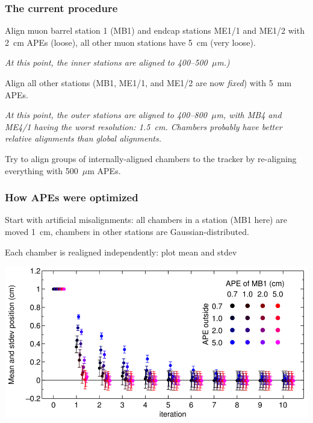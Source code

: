\documentclass[compress]{beamer}
\begin{document}
\begin{frame}
\frametitle{The current procedure}

\begin{enumerate}\setlength{\itemsep}{0.25 cm}
\item Align muon barrel station 1 (MB1) and endcap stations ME1/1 and
ME1/2 with 2~cm APEs (loose), all other muon stations have 5~cm (very
loose).

\vspace{0.25 cm}
{\it At this point, the inner stations are aligned to 400--500~$\mu$m.)

\item Align all other stations (MB1, ME1/1, and ME1/2 are now {\it
fixed}) with 5~mm APEs.}

\vspace{0.25 cm} {\it At this point, the outer stations are aligned to
400--800~$\mu$m, with MB4 and ME4/1 having the worst resolution:
1.5~cm.  Chambers probably have better relative alignments
than global alignments.}

\item Try to align groups of internally-aligned chambers to the
tracker by re-aligning everything with 500~$\mu$m APEs.

\end{enumerate}
\end{frame}

\begin{frame}
\frametitle{How APEs were optimized}

Start with artificial misalignments: all chambers in a station (MB1
here) are moved 1~cm, chambers in other stations are
Gaussian-distributed.

\vspace{0.1 cm}
Each chamber is realigned independently: plot mean and stdev

\begin{center}
\includegraphics[width=0.8\linewidth]{mb1_meanstdev.png}
\end{center}
\end{frame}
\end{document}
